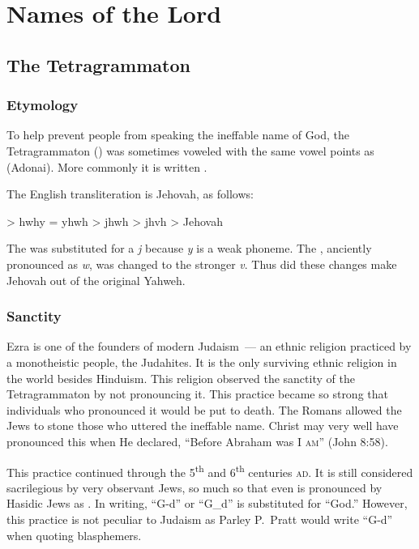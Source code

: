 \section{Names of the Lord}\label{app:names-of-the-lord}\thispagestyle{fancy}
\subsection{The Tetragrammaton}
\subsubsection{Etymology}
To help prevent people from speaking the ineffable name of God, the Tetragrammaton () was sometimes voweled with the same vowel points as  (Adonai). More commonly it is written .

The English transliteration is Jehovah, as follows:
\begin{center}
     > hwhy = yhwh > jhwh > jhvh > Jehovah
\end{center}
The  was substituted for a \emph{j} because \emph{y} is a weak phoneme. The , anciently pronounced as \emph{w}, was changed to the stronger \emph{v}. Thus did these changes make Jehovah out of the original Yahweh.

\subsubsection{Sanctity}
Ezra is one of the founders of modern Judaism~--- an ethnic religion practiced by a monotheistic people, the Judahites. It is the only surviving ethnic religion in the world besides Hinduism. This religion observed the sanctity of the Tetragrammaton by not pronouncing it. This practice became so strong that individuals who pronounced it would be put to death. The Romans allowed the Jews to stone those who uttered the ineffable name. Christ may very well have pronounced this when He declared, ``Before Abraham was \textsc{I am}'' (John 8:58).

This practice continued through the 5\textsuperscript{th} and 6\textsuperscript{th} centuries \textsc{ad}. It is still considered sacrilegious by very observant Jews, so much so that even  is pronounced by Hasidic Jews as . In writing, ``G-d'' or ``G\_{}d'' is substituted for ``God.'' However, this practice is not peculiar to Judaism as Parley P.\ Pratt would write ``G-d'' when quoting blasphemers.

